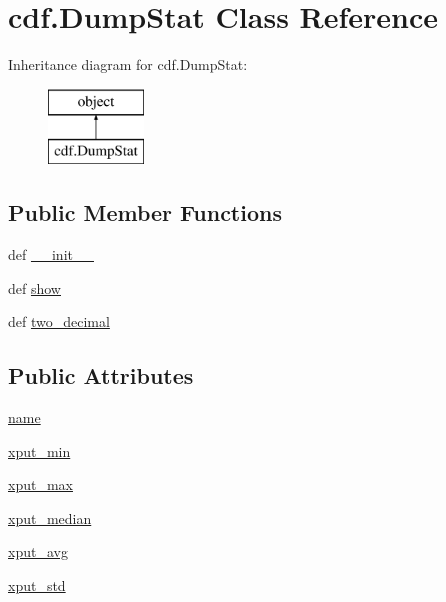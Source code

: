 \hypertarget{classcdf_1_1_dump_stat}{\section{cdf.\-Dump\-Stat Class Reference}
\label{classcdf_1_1_dump_stat}
}
Inheritance diagram for cdf.\-Dump\-Stat\-:\begin{figure}[H]
\begin{center}
\leavevmode
\includegraphics[height=2.000000cm]{classcdf_1_1_dump_stat}
\end{center}
\end{figure}
\subsection*{Public Member Functions}
\begin{DoxyCompactItemize}
\item 
def \hyperlink{classcdf_1_1_dump_stat_a5eec4a8104f13d0db2f52550939c063b}{\-\_\-\-\_\-init\-\_\-\-\_\-}
\item 
def \hyperlink{classcdf_1_1_dump_stat_a87ad3364e5d578a2939d0320d3befbd6}{show}
\item 
def \hyperlink{classcdf_1_1_dump_stat_a0c1bee4cb7e81c95688fd4aaa27f7373}{two\-\_\-decimal}
\end{DoxyCompactItemize}
\subsection*{Public Attributes}
\begin{DoxyCompactItemize}
\item 
\hyperlink{classcdf_1_1_dump_stat_ae693ca73d82126845880b10f07a82d94}{name}
\item 
\hyperlink{classcdf_1_1_dump_stat_acdcf65c5f0eedeb9c559099b6e817ea8}{xput\-\_\-min}
\item 
\hyperlink{classcdf_1_1_dump_stat_a2b3385cc8e90523350f8c8f280f8d2ae}{xput\-\_\-max}
\item 
\hyperlink{classcdf_1_1_dump_stat_a098a66c8979c1be0a7754ef568337a5b}{xput\-\_\-median}
\item 
\hyperlink{classcdf_1_1_dump_stat_a9a78dcffdce2a4a6164703e2efb6c519}{xput\-\_\-avg}
\item 
\hyperlink{classcdf_1_1_dump_stat_a2736270ac68b05550848435b6a291b3e}{xput\-\_\-std}
\end{DoxyCompactItemize}


